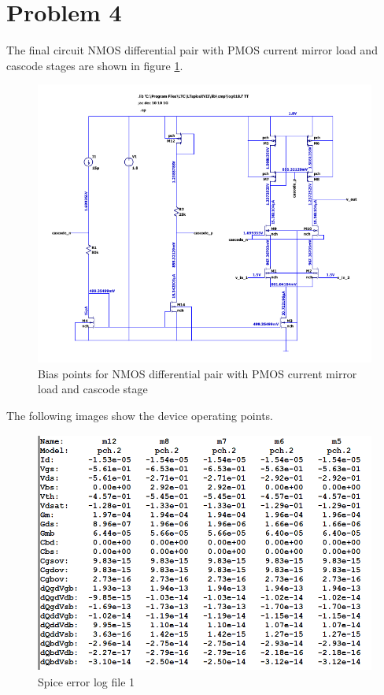 \documentclass{article}
\begin{document}
\section{Problem 4}
\label{sec:orgdf12f4f}
The final circuit NMOS differential pair with PMOS current mirror load and cascode stages are shown in figure \ref{fig:diff-mirror-cascode-q4}.
\begin{figure}[H]
\centering
\includegraphics[width=.9\linewidth]{img/q4/diff-mirror-cascode-1.pdf}
\caption{\label{fig:diff-mirror-cascode-q4}Bias points for NMOS differential pair with PMOS current mirror load and cascode stage}
\end{figure}

The following images show the device operating points.
\begin{figure}[H]
\centering
\includegraphics[height=300px]{img/q4/error-log/error-log-1.png}
\caption{\label{fig:err-1-q4}Spice error log file 1}
\end{figure}
\end{document}
